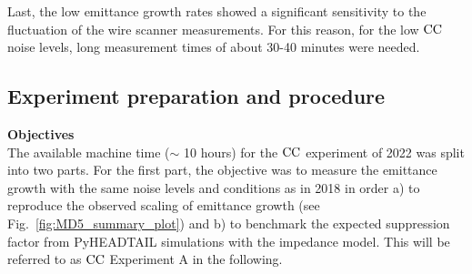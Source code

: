 
Last, the low emittance growth rates showed a significant sensitivity to the fluctuation of the wire scanner measurements. For this reason, for the low ${\mathrm{CC}}$ noise levels, long measurement times of about 30-40 minutes were needed.





\subsection{Experiment preparation and procedure}\label{sec:cc_md_2022_preparation}
\textbf{Objectives}\\
The available machine time ($\sim$ 10 hours) for the ${\mathrm{CC}}$ experiment of 2022 was split into two parts. For the first part, the objective was to measure the emittance growth with the same noise levels and conditions as in 2018 in order a) to reproduce the observed scaling of emittance growth (see Fig.~\ref{fig:MD5_summary_plot}) and b) to benchmark the expected suppression factor from PyHEADTAIL simulations with the impedance model. This will be referred to as ${\mathrm{CC}}$ Experiment A in the following.

